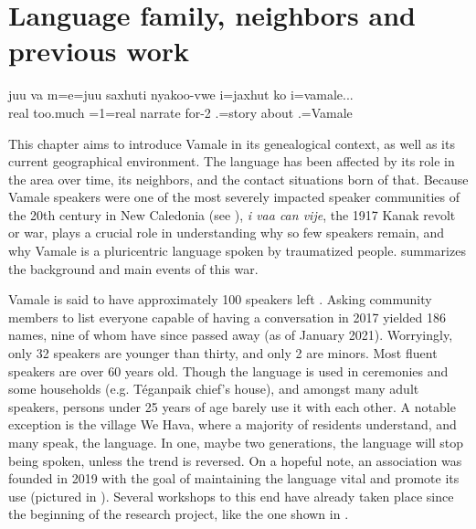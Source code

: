 \chapter{Language family, neighbors and previous work} %
\label{ChapterContext} %

\ea
\gll juu va m=e=juu saxhuti nyakoo-vwe i=jaxhut ko i=vamale...\\
 real too.much =1=real narrate for-2 .=story about .=Vamale\\
 \glt {}
\z

This chapter aims to introduce Vamale in its genealogical context, as well as its current geographical environment. The language has been affected by its role in the area over time, its neighbors, and the contact situations born of that. Because Vamale speakers were one of the most severely impacted speaker communities of the 20th century in New Caledonia (see ), \textit{i vaa can vije}, the 1917 Kanak revolt or war, plays a crucial role in understanding why so few speakers remain, and why Vamale is a pluricentric language spoken by traumatized people.  summarizes the background and main events of this war.

Vamale is said to have approximately 100 speakers left \parencite{eberhard_vamale_2020}. Asking community members to list everyone capable of having a conversation in 2017 yielded 186 names, nine of whom have since passed away (as of January 2021). Worryingly, only 32 speakers are younger than thirty, and only 2 are minors. Most fluent speakers are over 60 years old. Though the language is used in ceremonies and some households (e.g. Téganpaik chief's house), and amongst many adult speakers, persons under 25 years of age barely use it with each other. A notable exception is the village We Hava, where a majority of residents understand, and many speak, the language. In one, maybe two generations, the language will stop being spoken, unless the trend is reversed. 
On a hopeful note, an association was founded in 2019 with the goal of maintaining the language vital and promote its use (pictured in ). Several workshops to this end have already taken place since the beginning of the research project, like the one shown in .

